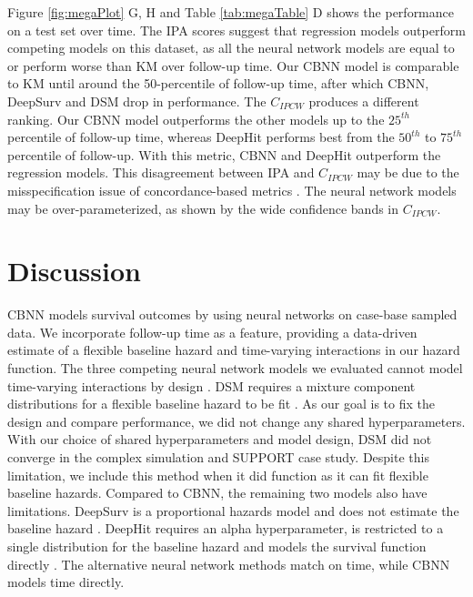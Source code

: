 \documentclass[AMA,STIX1COL,]{WileyNJD-v2}
\begin{document}
Figure \ref{fig:megaPlot} G, H and Table \ref{tab:megaTable} D shows the
performance on a test set over time. The IPA scores suggest that
regression models outperform competing models on this dataset, as all
the neural network models are equal to or perform worse than KM over
follow-up time. Our CBNN model is comparable to KM until around the
50-percentile of follow-up time, after which CBNN, DeepSurv and DSM drop
in performance. The \(C_{IPCW}\) produces a different ranking. Our CBNN
model outperforms the other models up to the \(25^{th}\) percentile of
follow-up time, whereas DeepHit performs best from the \(50^{th}\) to
\(75^{th}\) percentile of follow-up. With this metric, CBNN and DeepHit
outperform the regression models. This disagreement between IPA and
\(C_{IPCW}\) may be due to the misspecification issue of
concordance-based metrics \citep{cindexfails2019}. The neural network
models may be over-parameterized, as shown by the wide confidence bands
in \(C_{IPCW}\).

\hypertarget{discussion}{%
\section{Discussion}\label{discussion}}

CBNN models survival outcomes by using neural networks on case-base
sampled data. We incorporate follow-up time as a feature, providing a
data-driven estimate of a flexible baseline hazard and time-varying
interactions in our hazard function. The three competing neural network
models we evaluated cannot model time-varying interactions by design
\citep{dsmPaper} \citep{katzman2018DeepSurv} \citep{lee2018DeepHit}. DSM
requires a mixture component distributions for a flexible baseline
hazard to be fit \citep{dsmPaper}. As our goal is to fix the design and
compare performance, we did not change any shared hyperparameters. With
our choice of shared hyperparameters and model design, DSM did not
converge in the complex simulation and SUPPORT case study. Despite this
limitation, we include this method when it did function as it can fit
flexible baseline hazards. Compared to CBNN, the remaining two models
also have limitations. DeepSurv is a proportional hazards model and does
not estimate the baseline hazard \citep{katzman2018DeepSurv}. DeepHit
requires an alpha hyperparameter, is restricted to a single distribution
for the baseline hazard and models the survival function directly
\citep{lee2018DeepHit}. The alternative neural network methods match on
time, while CBNN models time directly.
\end{document}
